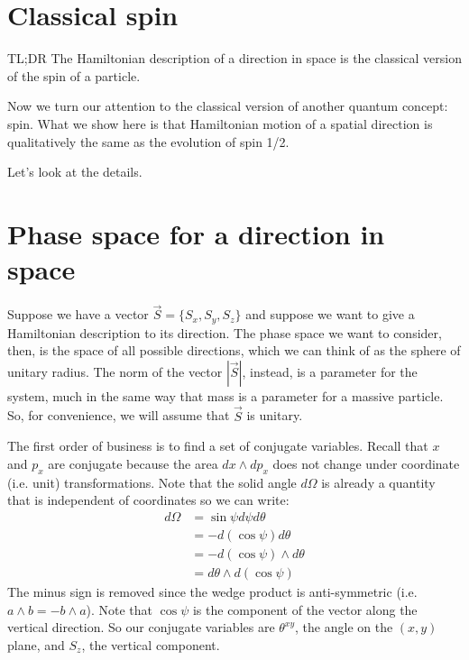 \documentclass[aps,pra,10pt,floatfix,nofootinbib]{revtex4-1}
\theoremstyle{definition}
\begin{document}
\section{Classical spin}

TL;DR The Hamiltonian description of a direction in space is the classical version of the spin of a particle.

Now we turn our attention to the classical version of another quantum concept: spin. What we show here is that Hamiltonian motion of a spatial direction is qualitatively the same as the evolution of spin 1/2.

Let's look at the details.

\section{Phase space for a direction in space}

Suppose we have a vector $\vec{S} = \{S_x, S_y, S_z\}$ and suppose we want to give a Hamiltonian description to its direction. The phase space we want to consider, then, is the space of all possible directions, which we can think of as the sphere of unitary radius. The norm of the vector $|\vec{S}|$, instead, is a parameter for the system, much in the same way that mass is a parameter for a massive particle. So, for convenience, we will assume that $\vec{S}$ is unitary.

The first order of business is to find a set of conjugate variables. Recall that $x$ and $p_x$ are conjugate because the area $dx \wedge dp_x$ does not change under coordinate (i.e. unit) transformations. Note that the solid angle $d\Omega$ is already a quantity that is independent of coordinates so we can write:
\begin{equation}
\begin{aligned}
d\Omega &= \sin \psi d\psi d\theta \\
&= - d(\cos \psi) d\theta \\
&= - d(\cos \psi) \wedge d\theta \\
&=  d\theta \wedge d(\cos \psi)
\end{aligned}
\label{DirectionDOF}
\end{equation}
The minus sign is removed since the wedge product is anti-symmetric (i.e. $a \wedge b = - b \wedge a$). Note that  $\cos \psi$ is the component of the vector along the vertical direction. So our conjugate variables are $\theta^{xy}$, the angle on the $(x, y)$ plane, and $S_z$, the vertical component.
\end{document}
